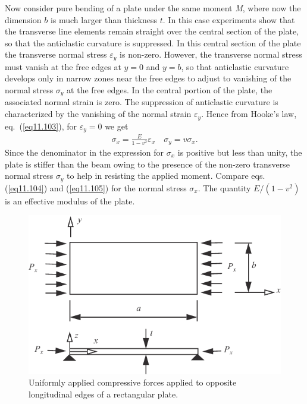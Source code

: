 \documentclass{AeroStructure-ERJohnson}
\begin{document}
Now consider pure bending of a plate under the same moment \textit{M}, where now the dimension $b$ is much larger than thickness $t$. In this case experiments show that the transverse line elements remain straight over the central section of the plate, so that the anticlastic curvature is suppressed. In this central section of the plate the transverse normal stress $\varepsilon_{{y}}$ is non-zero. However, the transverse normal stress must vanish at the free edges at $y=0$ and $y=b$, so that anticlastic curvature develops only in narrow zones near the free edges to adjust to vanishing of the normal stress $\sigma_{y}$ at the free edges. In the central portion of the plate, the associated normal strain is zero. The suppression of anticlastic curvature is characterized by the vanishing of the normal strain $\varepsilon_{{y}}$. Hence from Hooke's law, eq.~(\ref{eq11.103}), for $\varepsilon_{{y}} = 0$ we get
\begin{align}\label{eq11.105}
\sigma_{x}=\frac{E}{1-v^{2}} \varepsilon_{x} \quad \sigma_{y}=v \sigma_{x}.
\end{align}
Since the denominator in the expression for $\sigma_{{x}}$ is positive but less than unity, the plate is stiffer than the beam owing to the presence of the non-zero transverse normal stress $\sigma_{y}$ to help in resisting the applied moment. Compare eqs. (\ref{eq11.104}) and (\ref{eq11.105}) for the normal stress $\sigma_{{x}}$. The quantity $E /\left(1-v^{2}\right)$ is an effective modulus of the plate.

\begin{figure}[!h]
\centerline{\includegraphics{Figure_11-24.pdf}}
\caption{Uniformly applied compressive forces applied to opposite longitudinal edges of a rectangular plate. } \label{fig11.24}
\end{figure}
\end{document}
